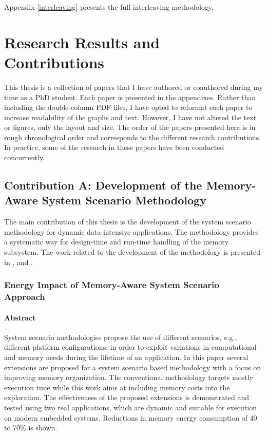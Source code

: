 Appendix \ref{interleaving} presents the full interleaving methodology.

\chapter{Research Results and Contributions}
\label{research}

This thesis is a collection of papers that I have authored or coauthored during my time as a PhD student. 
Each paper is presented in the appendixes. 
Rather than including the double-column PDF files, I have opted to reformat each paper to increase readability of the graphs and text. 
However, I have not altered the text or figures, only the layout and size.
The order of the papers presented here is in rough chronological order and corresponds to the different research contributions. 
In practice, some of the research in these papers have been conducted concurrently.

\section{Contribution A: Development of the Memory-Aware System Scenario Methodology}

The main contribution of this thesis is the development of the system scenario methodology for dynamic data-intensive applications.
The methodology provides a systematic way for design-time and run-time handling of the memory subsystem.
The work related to the development of the methodology is presented in \cite{Fil12}, \cite{filippopoulos2013exploration} and \cite{zompakis2014systematic}.

\subsection{Energy Impact of Memory-Aware System Scenario Approach}

\subsubsection{Abstract}

System scenario methodologies propose the use of different scenarios, e.g., different platform configurations, in order to exploit variations in computational and memory needs during the lifetime of an application. In this paper several extensions are proposed for a system scenario based methodology with a focus on improving memory organization. The conventional methodology targets mostly execution time while this work aims at including memory costs into the exploration. The effectiveness of the proposed extensions is demonstrated and tested using two real applications, which are dynamic and suitable for execution on modern embedded systems. Reductions in memory energy consumption of 40 to 70\% is shown.

